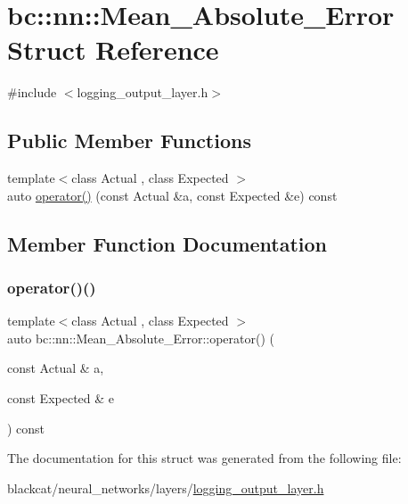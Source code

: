 \hypertarget{structbc_1_1nn_1_1Mean__Absolute__Error}{}\section{bc\+:\+:nn\+:\+:Mean\+\_\+\+Absolute\+\_\+\+Error Struct Reference}
\label{structbc_1_1nn_1_1Mean__Absolute__Error}


{\ttfamily \#include $<$logging\+\_\+output\+\_\+layer.\+h$>$}

\subsection*{Public Member Functions}
\begin{DoxyCompactItemize}
\item 
{\footnotesize template$<$class Actual , class Expected $>$ }\\auto \hyperlink{structbc_1_1nn_1_1Mean__Absolute__Error_afea9588dbf612f053a07ac56c11a4a94}{operator()} (const Actual \&a, const Expected \&e) const
\end{DoxyCompactItemize}


\subsection{Member Function Documentation}
\mbox{\label{structbc_1_1nn_1_1Mean__Absolute__Error_afea9588dbf612f053a07ac56c11a4a94}} 
\subsubsection{\texorpdfstring{operator()()}{operator()()}}
{\footnotesize\ttfamily template$<$class Actual , class Expected $>$ \\
auto bc\+::nn\+::\+Mean\+\_\+\+Absolute\+\_\+\+Error\+::operator() (\begin{DoxyParamCaption}\item[{const Actual \&}]{a,  }\item[{const Expected \&}]{e }\end{DoxyParamCaption}) const\hspace{0.3cm}{\ttfamily [inline]}}



The documentation for this struct was generated from the following file\+:\begin{DoxyCompactItemize}
\item 
blackcat/neural\+\_\+networks/layers/\hyperlink{logging__output__layer_8h}{logging\+\_\+output\+\_\+layer.\+h}\end{DoxyCompactItemize}
